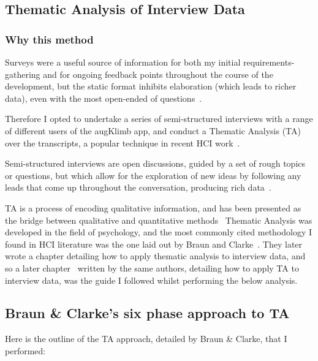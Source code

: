 \subsection{Thematic Analysis of Interview Data}
\subsubsection{Why this method}
Surveys were a useful source of information for both my initial requirements-gathering and for ongoing feedback points throughout the course of the development, but the static format inhibits elaboration (which leads to richer data), even with the most open-ended of questions~\cite{ozoksurvey}.

Therefore I opted to undertake a series of semi-structured interviews with a range of different users of the augKlimb app, and conduct a Thematic Analysis (TA) over the transcripts, a popular technique in recent HCI work~\cite{themanbrown}.

Semi-structured interviews are open discussions, guided by a set of rough topics or questions, but which allow for the exploration of new ideas by following any leads that come up throughout the conversation, producing rich data~\cite{oro11911}.

TA is a process of encoding qualitative information, and has been presented as the bridge between qualitative and quantitative methods~\cite{boyatzis1998transforming}
Thematic Analysis was developed in the field of psychology, and the most commonly cited methodology I found in HCI literature was the one laid out by Braun and Clarke~\cite{braunclarke06}.
They later wrote a chapter detailing how to apply thematic analysis to interview data, and so a later chapter~\cite{brauminterviewta} written by the same authors, detailing how to apply TA to interview data, was the guide I followed whilst performing the below analysis.

\subsection{Braun \& Clarke’s six phase approach to TA}
Here is the outline of the TA approach, detailed by Braun \& Clarke, that I performed:

